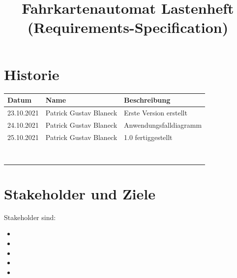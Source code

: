 \documentclass{lastenheft}
\title{Fahrkartenautomat Lastenheft \\ (Requirements-Specification)}
\begin{document}
\maketitle

\tableofcontents

\section{Historie}
\begin{tabularx}{\textwidth}{|l|l|X|}
    \hline
    \textbf{Datum} & \textbf{Name}          & \textbf{Beschreibung}  \\
    \hline
    23.10.2021     & Patrick Gustav Blaneck & Erste Version erstellt \\
    \hline
    24.10.2021     & Patrick Gustav Blaneck & Anwendungsfalldiagramm \\
    \hline
    25.10.2021     & Patrick Gustav Blaneck & 1.0 fertiggestellt     \\
    \hline
                   &                        &                        \\
    \hline
                   &                        &                        \\
    \hline
                   &                        &                        \\
    \hline
                   &                        &                        \\
    \hline
                   &                        &                        \\
    \hline
                   &                        &                        \\
    \hline
                   &                        &                        \\
    \hline
                   &                        &                        \\
    \hline
\end{tabularx}

\newpage

\section{Stakeholder und Ziele}

Stakeholder sind:
\begin{itemize}
    \item {}
    \item {}
    \item {}
    \item {}
    \item {}
\end{itemize}
\end{document}
